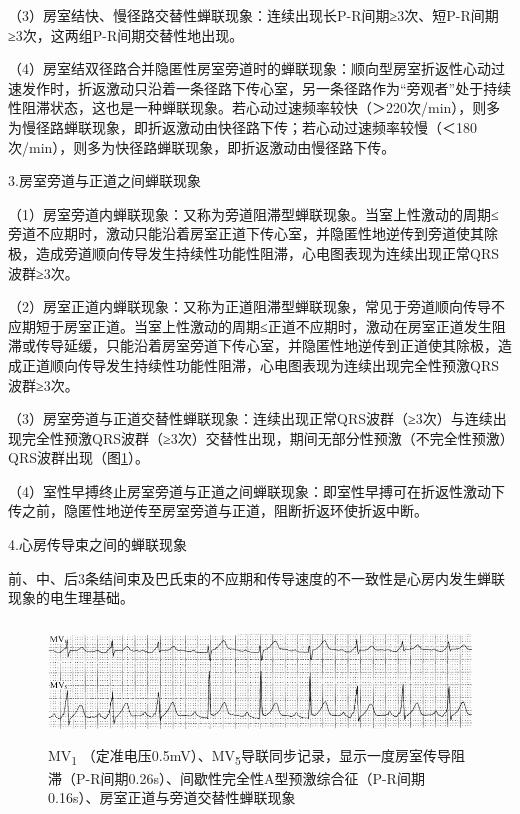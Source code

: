 （3）房室结快、慢径路交替性蝉联现象：连续出现长P-R间期≥3次、短P-R间期≥3次，这两组P-R间期交替性地出现。

（4）房室结双径路合并隐匿性房室旁道时的蝉联现象：顺向型房室折返性心动过速发作时，折返激动只沿着一条径路下传心室，另一条径路作为“旁观者”处于持续性阻滞状态，这也是一种蝉联现象。若心动过速频率较快（＞220次/min），则多为慢径路蝉联现象，即折返激动由快径路下传；若心动过速频率较慢（＜180次/min），则多为快径路蝉联现象，即折返激动由慢径路下传。

3.房室旁道与正道之间蝉联现象

（1）房室旁道内蝉联现象：又称为旁道阻滞型蝉联现象。当室上性激动的周期≤旁道不应期时，激动只能沿着房室正道下传心室，并隐匿性地逆传到旁道使其除极，造成旁道顺向传导发生持续性功能性阻滞，心电图表现为连续出现正常QRS波群≥3次。

（2）房室正道内蝉联现象：又称为正道阻滞型蝉联现象，常见于旁道顺向传导不应期短于房室正道。当室上性激动的周期≤正道不应期时，激动在房室正道发生阻滞或传导延缓，只能沿着房室旁道下传心室，并隐匿性地逆传到正道使其除极，造成正道顺向传导发生持续性功能性阻滞，心电图表现为连续出现完全性预激QRS波群≥3次。

（3）房室旁道与正道交替性蝉联现象：连续出现正常QRS波群（≥3次）与连续出现完全性预激QRS波群（≥3次）交替性出现，期间无部分性预激（不完全性预激）QRS波群出现（图\ref{fig35-8}）。

（4）室性早搏终止房室旁道与正道之间蝉联现象：即室性早搏可在折返性激动下传之前，隐匿性地逆传至房室旁道与正道，阻断折返环使折返中断。

4.心房传导束之间的蝉联现象

前、中、后3条结间束及巴氏束的不应期和传导速度的不一致性是心房内发生蝉联现象的电生理基础。

\begin{figure}[!htbp]
 \centering
 \includegraphics[width=5.5625in,height=1.25in]{./images/Image00561.jpg}
 \captionsetup{justification=centering}
 \caption{MV\textsubscript{1} （定准电压0.5mV）、MV\textsubscript{5}导联同步记录，显示一度房室传导阻滞（P-R间期0.26s）、间歇性完全性A型预激综合征（P-R间期0.16s）、房室正道与旁道交替性蝉联现象}
 \label{fig35-8}
  \end{figure} 


